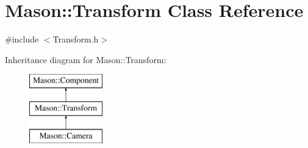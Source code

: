 \hypertarget{class_mason_1_1_transform}{}\section{Mason\+:\+:Transform Class Reference}
\label{class_mason_1_1_transform}


{\ttfamily \#include $<$Transform.\+h$>$}

Inheritance diagram for Mason\+:\+:Transform\+:\begin{figure}[H]
\begin{center}
\leavevmode
\includegraphics[height=3.000000cm]{class_mason_1_1_transform}
\end{center}
\end{figure}
